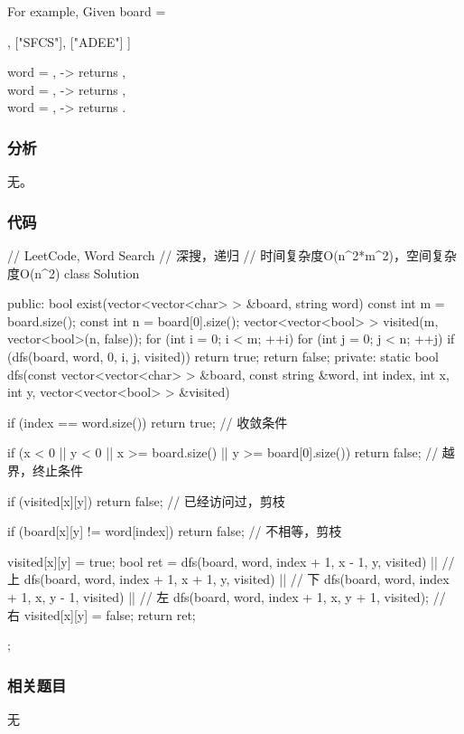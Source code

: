 For example,
Given board =
\begin{Code}
[
  ["ABCE"],
  ["SFCS"],
  ["ADEE"]
]
\end{Code}
word = , -> returns ,\\
word = , -> returns ,\\
word = , -> returns .


\subsubsection{分析}
无。


\subsubsection{代码}
\begin{Code}
// LeetCode, Word Search
// 深搜，递归
// 时间复杂度O(n^2*m^2)，空间复杂度O(n^2)
class Solution {
public:
    bool exist(vector<vector<char> > &board, string word) {
        const int m = board.size();
        const int n = board[0].size();
        vector<vector<bool> > visited(m, vector<bool>(n, false));
        for (int i = 0; i < m; ++i)
            for (int j = 0; j < n; ++j)
                if (dfs(board, word, 0, i, j, visited))
                    return true;
        return false;
    }
private:
    static bool dfs(const vector<vector<char> > &board, const string &word,
            int index, int x, int y, vector<vector<bool> > &visited) {
        if (index == word.size())
            return true; // 收敛条件

        if (x < 0 || y < 0 || x >= board.size() || y >= board[0].size())
            return false;  // 越界，终止条件

        if (visited[x][y]) return false; // 已经访问过，剪枝

        if (board[x][y] != word[index]) return false; // 不相等，剪枝

        visited[x][y] = true;
        bool ret = dfs(board, word, index + 1, x - 1, y, visited) || // 上
                dfs(board, word, index + 1, x + 1, y, visited)    || // 下
                dfs(board, word, index + 1, x, y - 1, visited)    || // 左
                dfs(board, word, index + 1, x, y + 1, visited);      // 右
        visited[x][y] = false;
        return ret;
    }
};
\end{Code}


\subsubsection{相关题目}
\begindot
\item 无
\myenddot


